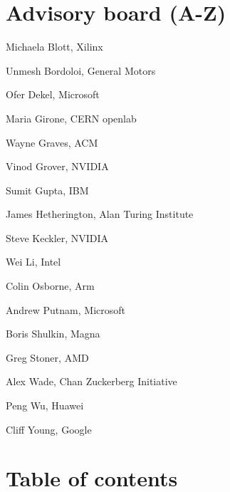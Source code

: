 \documentclass[10pt,onecolumn]{article}
\newenvironment{packed_itemize}{
\begin{itemize}
  \setlength{\itemsep}{1pt}
  \setlength{\parskip}{0pt}
  \setlength{\parsep}{0pt}
}{\end{itemize}}
\begin{document}
\section*{Advisory board (A-Z)}

\begin{packed_itemize}

 \item Michaela Blott, Xilinx
 \item Unmesh Bordoloi, General Motors
 \item Ofer Dekel, Microsoft
 \item Maria Girone, CERN openlab
 \item Wayne Graves, ACM
 \item Vinod Grover, NVIDIA
 \item Sumit Gupta, IBM
 \item James Hetherington, Alan Turing Institute
 \item Steve Keckler, NVIDIA
 \item Wei Li, Intel
 \item Colin Osborne, Arm
 \item Andrew Putnam, Microsoft
 \item Boris Shulkin, Magna
 \item Greg Stoner, AMD
 \item Alex Wade, Chan Zuckerberg Initiative
 \item Peng Wu, Huawei
 \item Cliff Young, Google 

\end{packed_itemize}

\section*{Table of contents}
\label{sec:overview}
\end{document}
